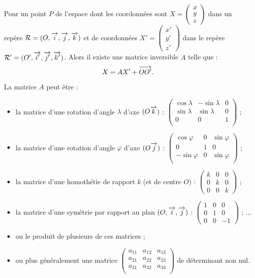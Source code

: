 \documentclass[class=report,crop=false]{standalone}
\begin{document}
\bigskip

Pour un point $P$ de l'espace dont les coordonnées sont 
$X= \left(\begin{smallmatrix}x\\y\\z\end{smallmatrix}\right)$
dans un repère $\mathcal{R} = (O,\overrightarrow{i},\overrightarrow{j},\overrightarrow{k})$ et 
de coordonnées $X' = \left(\begin{smallmatrix}x'\\y'\\z'\end{smallmatrix}\right)$
dans le repère $\mathcal{R}'= (O',\overrightarrow{i'},\overrightarrow{j'},\overrightarrow{k'})$. 
Alors il existe une matrice inversible $A$ telle que :
$$X = A X' + \overrightarrow{OO'}.$$

La matrice $A$ peut être :
\begin{itemize}
  \item la matrice d'une rotation d'angle $\lambda$ d'axe $(O\overrightarrow{k})$ :
$\begin{pmatrix}
\cos \lambda & -\sin \lambda & 0 \\
\sin \lambda & \sin \lambda  & 0 \\
0            & 0             & 1 \\
\end{pmatrix}$ ;
  \item la matrice d'une rotation d'angle $\varphi$ d'axe $(O\overrightarrow{j})$ :
$\begin{pmatrix}
\cos \varphi & 0 & \sin \varphi \\
0            & 1 & 0 \\
-\sin \varphi & 0 & \sin \varphi \\
\end{pmatrix}$ ;
  \item la matrice d'une homothétie de rapport $k$  (et de centre $O$) :
$\begin{pmatrix}k&0&0\\0&k&0\\0&0&k\end{pmatrix}$ ;
  \item la matrice d'une symétrie par rapport au plan $(O,\overrightarrow{i},\overrightarrow{j})$ :
  $\begin{pmatrix}1&0&0\\0&1&0\\0&0&-1\end{pmatrix}$ ; ...
  \item ou le produit de plusieurs de ces matrices ;
  \item ou plus généralement une matrice 
  $\begin{pmatrix}
  a_{11}&a_{12}&a_{13}\\
  a_{21}&a_{22}&a_{23}\\
  a_{31}&a_{32}&a_{33}\\
  \end{pmatrix}$ de déterminant non nul.
\end{itemize}
\end{document}
